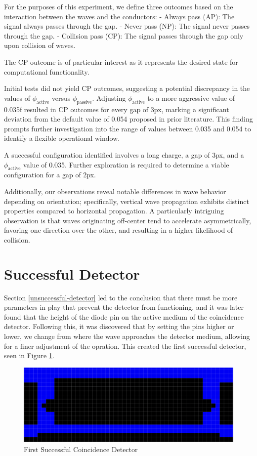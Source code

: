 For the purposes of this experiment, we define three outcomes based on the interaction between the waves and the conductors:
- Always pass (AP): The signal always passes through the gap.
- Never pass (NP): The signal never passes through the gap.
- Collision pass (CP): The signal passes through the gap only upon collision of waves.

The CP outcome is of particular interest as it represents the desired state for computational functionality.

Initial tests did not yield CP outcomes, suggesting a potential discrepancy in the values of $\phi_{\text{active}}$ versus $\phi_{\text{passive}}$. Adjusting $\phi_{\text{active}}$ to a more aggressive value of 0.035f resulted in CP outcomes for every gap of 3px, marking a significant deviation from the default value of 0.054 proposed in prior literature. This finding prompts further investigation into the range of values between 0.035 and 0.054 to identify a flexible operational window. 

A successful configuration identified involves a long charge, a gap of 3px, and a $\phi_{\text{active}}$ value of 0.035. Further exploration is required to determine a viable configuration for a gap of 2px.

Additionally, our observations reveal notable differences in wave behavior depending on orientation; specifically, vertical wave propagation exhibits distinct properties compared to horizontal propagation. A particularly intriguing observation is that waves originating off-center tend to accelerate asymmetrically, favoring one direction over the other, and resulting in a higher likelihood of collision.

\section{Successful Detector}

Section \ref{unsuccessful-detector} led to the conclusion that there must be more parameters in play that prevent the detector from functioning, and it was later found that the height of the diode pin on the active medium of the coincidence detector. 
Following this, it was discovered that by setting the pins higher or lower, we change from where the wave approaches the detector medium, allowing for a finer adjustment of the opration. This created the first successful detector, seen in Figure \ref{fig:first-successful-detector}.

\begin{figure}
    \centering
    \includegraphics[width=0.75\linewidth]{image9.png}
    \caption{First Successful Coincidence Detector}
    \label{fig:first-successful-detector}
\end{figure}


